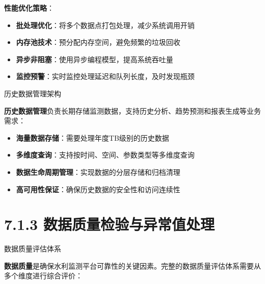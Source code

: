 \textbf{性能优化策略}：

\begin{itemize}
\tightlist
\item
  \textbf{批处理优化}：将多个数据点打包处理，减少系统调用开销
\item
  \textbf{内存池技术}：预分配内存空间，避免频繁的垃圾回收
\item
  \textbf{异步非阻塞}：使用异步编程模型，提高系统吞吐量
\item
  \textbf{监控预警}：实时监控处理延迟和队列长度，及时发现瓶颈
\end{itemize}

 历史数据管理架构

\textbf{历史数据管理}负责长期存储监测数据，支持历史分析、趋势预测和报表生成等业务需求：

\begin{itemize}
\tightlist
\item
  \textbf{海量数据存储}：需要处理年度TB级别的历史数据
\item
  \textbf{多维度查询}：支持按时间、空间、参数类型等多维度查询
\item
  \textbf{数据生命周期管理}：实现数据的分层存储和归档清理
\item
  \textbf{高可用性保证}：确保历史数据的安全性和访问连续性
\end{itemize}

\section{7.1.3 数据质量检验与异常值处理}

 数据质量评估体系

\textbf{数据质量}是确保水利监测平台可靠性的关键因素。完整的数据质量评估体系需要从多个维度进行综合评价：

